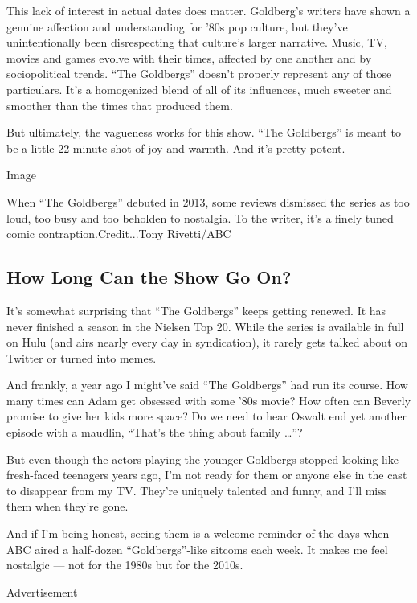 This lack of interest in actual dates does matter. Goldberg's writers
have shown a genuine affection and understanding for '80s pop culture,
but they've unintentionally been disrespecting that culture's larger
narrative. Music, TV, movies and games evolve with their times, affected
by one another and by sociopolitical trends. ``The Goldbergs'' doesn't
properly represent any of those particulars. It's a homogenized blend of
all of its influences, much sweeter and smoother than the times that
produced them.

But ultimately, the vagueness works for this show. ``The Goldbergs'' is
meant to be a little 22-minute shot of joy and warmth. And it's pretty
potent.

Image

When ``The Goldbergs'' debuted in 2013, some reviews dismissed the
series as too loud, too busy and too beholden to nostalgia. To the
writer, it's a finely tuned comic contraption.Credit...Tony Rivetti/ABC

\hypertarget{how-long-can-the-show-go-on}{%
\subsection{How Long Can the Show Go
On?}\label{how-long-can-the-show-go-on}}

It's somewhat surprising that ``The Goldbergs'' keeps getting renewed.
It has never finished a season in the Nielsen Top 20. While the series
is available in full on Hulu (and airs nearly every day in syndication),
it rarely gets talked about on Twitter or turned into memes.

And frankly, a year ago I might've said ``The Goldbergs'' had run its
course. How many times can Adam get obsessed with some '80s movie? How
often can Beverly promise to give her kids more space? Do we need to
hear Oswalt end yet another episode with a maudlin, ``That's the thing
about family \ldots{}''?

But even though the actors playing the younger Goldbergs stopped looking
like fresh-faced teenagers years ago, I'm not ready for them or anyone
else in the cast to disappear from my TV. They're uniquely talented and
funny, and I'll miss them when they're gone.

And if I'm being honest, seeing them is a welcome reminder of the days
when ABC aired a half-dozen ``Goldbergs''-like sitcoms each week. It
makes me feel nostalgic --- not for the 1980s but for the 2010s.

Advertisement

